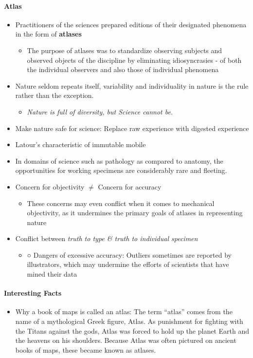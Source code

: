 \documentclass[a4paper]{article}
\begin{document}
\paragraph{Atlas}
\begin{itemize}
	\item Practitioners of the sciences prepared editions of their designated phenomena in the form of \textbf{atlases}
	\begin{itemize}[label=$\circ$]
		\item The purpose of atlases was to standardize observing subjects and observed objects of the discipline by eliminating idiosyncrasies - of both the individual observers and also those of individual phenomena
	\end{itemize}
	\item Nature seldom repeats itself, variability and individuality in nature is the rule rather than the exception.
	\begin{itemize}[label=$\circ$]
		\item \textit{Nature is full of diversity, but Science cannot be.}
	\end{itemize}
	\item Make nature safe for science: Replace raw experience with digested experience
	\item Latour’s characteristic of immutable mobile
	\item In domains of science such as pathology as compared to anatomy, the opportunities for working specimens are considerably rare and fleeting.
	\item Concern for objectivity $\neq$ Concern for accuracy
	\begin{itemize}[label=$\circ$]
		\item These concerns may even conflict when it comes to mechanical objectivity, as it undermines the primary goals of atlases in representing nature
	\end{itemize}
	\item Conflict between \textit{truth to type \& truth to individual specimen}
	\begin{itemize}[label=$\circ$]
		\item ○	Dangers of excessive accuracy: Outliers sometimes are reported by illustrators, which may undermine the efforts of scientists that have mined their data
	\end{itemize}
\end{itemize}

\paragraph{Interesting Facts}
\begin{itemize}[label=$\circ$]
	\item Why a book of maps is called an atlas: The term “atlas” comes from the name of a mythological Greek figure, Atlas. As punishment for fighting with the Titans against the gods, Atlas was forced to hold up the planet Earth and the heavens on his shoulders. Because Atlas was often pictured on ancient books of maps, these became known as atlases.
\end{itemize}
\end{document}
